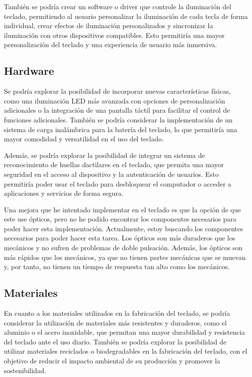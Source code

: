 También se podría crear un software o driver que controle la iluminación del teclado, permitiendo al usuario personalizar la iluminación de cada tecla de forma individual, crear efectos de iluminación personalizados y sincronizar la iluminación con otros dispositivos compatibles. Esto permitiría una mayor personalización del teclado y una experiencia de usuario más inmersiva.

\subsection{Hardware}
Se podría explorar la posibilidad de incorporar nuevas características físicas, como una iluminación LED más avanzada con opciones de personalización adicionales o la integración de una pantalla táctil para facilitar el control de funciones adicionales. También se podría considerar la implementación de un sistema de carga inalámbrica para la batería del teclado, lo que permitiría una mayor comodidad y versatilidad en el uso del teclado.

Además, se podría explorar la posibilidad de integrar un sistema de reconocimiento de huellas dactilares en el teclado, que permita una mayor seguridad en el acceso al dispositivo y la autenticación de usuarios. Esto permitiría poder usar el teclado para desbloquear el computador o acceder a aplicaciones y servicios de forma segura.

Una mejora que he intentado implementar en el teclado es que la opción de que este use  ópticos, pero no he podido encontrar los componentes necesarios para poder hacer esta implementación. Actualmente, estoy buscando los componentes necesarios para poder hacer esta tarea. Los  ópticos son más duraderos que los  mecánicos y no sufren de problemas de doble pulsación. Además, los  ópticos son más rápidos que los  mecánicos, ya que no tienen partes mecánicas que se muevan y, por tanto, no tienen un tiempo de respuesta tan alto como los  mecánicos.

\subsection{Materiales}
En cuanto a los materiales utilizados en la fabricación del teclado, se podría considerar la utilización de materiales más resistentes y duraderos, como el aluminio o el acero inoxidable, que permitan una mayor durabilidad y resistencia del teclado ante el uso diario. También se podría explorar la posibilidad de utilizar materiales reciclados o biodegradables en la fabricación del teclado, con el objetivo de reducir el impacto ambiental de su producción y promover la sostenibilidad.

